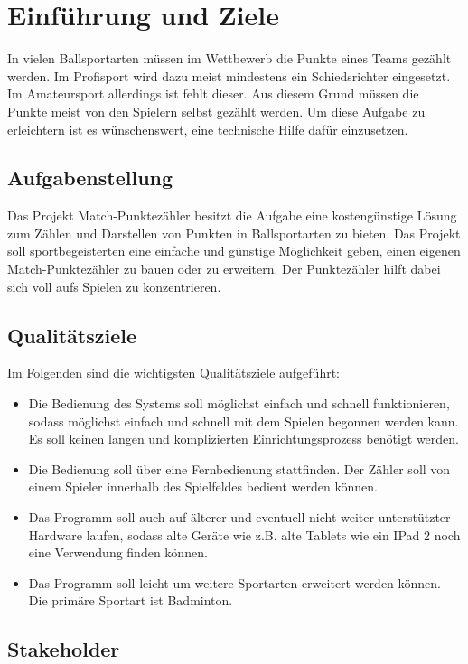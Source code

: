 \chapter{Einführung und Ziele}
In vielen Ballsportarten müssen im Wettbewerb die Punkte eines Teams gezählt werden. Im Profisport wird dazu meist mindestens ein Schiedsrichter eingesetzt. Im Amateursport allerdings ist fehlt dieser. Aus diesem Grund müssen die Punkte meist von den Spielern selbst gezählt werden. Um diese Aufgabe zu erleichtern ist es wünschenswert, eine technische Hilfe dafür einzusetzen. 
\section{Aufgabenstellung}
Das Projekt Match-Punktezähler besitzt die Aufgabe eine kostengünstige Lösung zum Zählen und Darstellen von Punkten in Ballsportarten zu bieten. Das Projekt soll sportbegeisterten eine einfache und günstige Möglichkeit geben, einen eigenen Match-Punktezähler zu bauen oder zu erweitern. Der Punktezähler hilft dabei sich voll aufs Spielen zu konzentrieren.  
\section{Qualitätsziele}
Im Folgenden sind die wichtigsten Qualitätsziele aufgeführt:\\
\begin{itemize}
	\item Die Bedienung des Systems soll möglichst einfach und schnell funktionieren, sodass möglichst einfach und schnell mit dem Spielen begonnen werden kann. Es soll keinen langen und komplizierten Einrichtungsprozess benötigt werden. 
	\item Die Bedienung soll über eine Fernbedienung stattfinden. Der Zähler soll von einem Spieler innerhalb des Spielfeldes bedient werden können. 
	\item Das Programm soll auch auf älterer und eventuell nicht weiter unterstützter Hardware laufen, sodass alte Geräte wie z.B. alte Tablets wie ein IPad 2 noch eine Verwendung finden können.
	\item Das Programm soll leicht um weitere Sportarten erweitert werden können. Die primäre Sportart ist Badminton. 
\end{itemize}
\section{Stakeholder}
